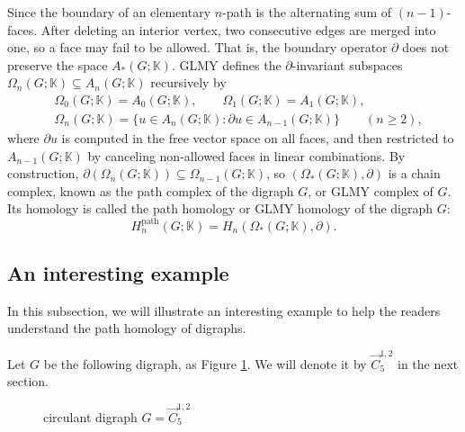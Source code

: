 \documentclass[11pt]{amsart}
\newcommand{\K}{\mathbb K}
\theoremstyle{plain}
\theoremstyle{definition}
\numberwithin{equation}{section}
\begin{document}
Since the boundary of an elementary $n$-path is the alternating sum of $(n-1)$-faces.
After deleting an interior vertex, two consecutive edges are merged into one, so a face may fail to be allowed.  That is, the boundary operator $\partial$ does not preserve the space $A_*(G;\K)$. GLMY defines the $\partial$-invariant subspaces $\Omega_n(G;\K)\subseteq A_n(G;\K)$ recursively by
\begin{align*}
&\Omega_0(G;\K)=A_0(G;\K),\qquad \Omega_1(G;\K)=A_1(G;\K),\\
&\Omega_n(G;\K)=\{u\in A_n(G;\K):\partial u\in A_{n-1}(G;\K)\}\qquad (n\ge 2),
\end{align*}
where $\partial u$ is computed in the free vector space on all faces, and then
restricted to $A_{n-1}(G;\K)$ by canceling non-allowed faces in linear combinations.
By construction, $\partial(\Omega_n(G;\K))\subseteq \Omega_{n-1}(G;\K)$, so $(\Omega_*(G;\K),\partial)$
is a chain complex, known as the path complex of the digraph $G$, or GLMY complex of $G$.  Its homology is called the path homology or GLMY homology of the digraph $G$:
\[
H_n^{\mathrm{path}}(G;\K)=H_n(\Omega_*(G;\K),\partial).
\]




\vskip 0.2cm
\subsection{An interesting example}\label{sub:example1}


In this subsection, we will illustrate an interesting example to help the readers understand the path homology of digraphs.


Let $G$ be the following digraph, as Figure \ref{fig:C512}. We will denote it by $\vec{C}_5^{1,2}$ in the next section.
\begin{figure}[h]
\centering
{}
\caption{circulant digraph $G=\vec{C}_5^{1,2}$} 
\label{fig:C512} 
\end{figure}
\end{document}
